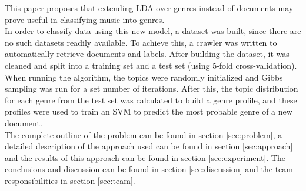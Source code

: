 This paper proposes that extending LDA over genres instead of documents may prove useful in classifying music into genres.\\
In order to classify data using this new model, a dataset was built, since there are no such datasets readily available. To achieve this, a crawler was written to automatically retrieve documents and labels. After building the dataset, it was cleaned and split into a training set and a test set (using 5-fold cross-validation). When running the algorithm, the topics were randomly initialized and Gibbs sampling was run for a set number of iterations. After this, the topic distribution for each genre from the test set was calculated to build a genre profile, and these profiles were used to train an SVM to predict the most probable genre of a new document.\\
The complete outline of the problem can be found in section \ref{sec:problem}, a detailed description of the approach used can be found in section \ref{sec:approach} and the results of this approach can be found in section \ref{sec:experiment}. The conclusions and discussion can be found in section \ref{sec:discussion} and the team responsibilities in section \ref{sec:team}.